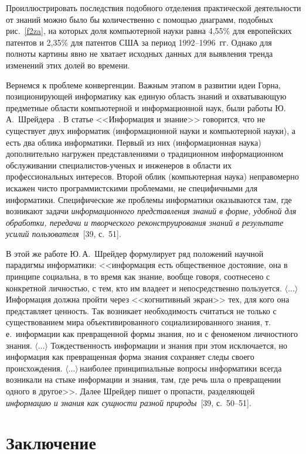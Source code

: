 \begin{multicols}{2}
      Проиллюстрировать последствия подобного от\-де\-ле\-ния практической деятельности от
знаний можно было бы количественно с помощью диаграмм, подобных рис.~\ref{f2za}, 
на которых доля ком\-пьютер\-ной науки равна 4,55\% для европейских патен\-тов и
2,35\% для патентов США за период 1992--1996~гг. Однако для полноты картины явно не
хватает исходных данных для выявления тренда изменений этих долей во времени.

      Вернемся к проблеме конвергенции. Важным этапом в развитии идеи Горна,
позиционирующей информатику как единую область знаний и охватывающую предметные
области компьютерной и информационной наук, были работы Ю.\,А.~Шрейдера~\cite{38za, 39za}. 
В статье <<Информация и знание>> говорится, что не существует двух
информатик (информационной науки и компьютерной науки), а есть два облика информатики.
Первый из них (информационная наука) дополнительно нагружен представлениями о
традиционном информационном обслуживании специалистов-ученых и инженеров в области
их профессиональных интересов. Второй облик (компьютерная наука) неправомерно искажен
чисто программистскими проблемами, не специфичными для информатики. Специфические же
проблемы информатики оказываются там, где возникают задачи \textit{информационного
представления знаний в форме, удобной для обработки, передачи и творческого
реконструирования знаний в результате усилий пользователя}~[39, с.~51].

      В этой же работе Ю.\,А.~Шрейдер формулирует ряд положений научной парадигмы
информатики: <<информация есть общественное достояние, она в принципе социальна, в то
время как знание, вообще говоря, соотнесено с конкретной личностью, с тем, кто им владеет и
непосредственно пользуется. $\langle\ldots\rangle$ Информация должна пройти через
<<когнитивный экран>> тех, для кого она пред\-став\-ля\-ет ценность. Так возникает необходимость
считаться не только с суще\-ст\-во\-ва\-ни\-ем мира объективированного социализированного знания,
т.\,е.\ информации как превращенной формы знания, но и с феноменом личностного знания.
$\langle\ldots\rangle$ Тож\-де\-ст\-вен\-ность информации и знания при этом исключается, но
информация как превращенная форма знания сохраняет следы своего происхождения.
$\langle\ldots\rangle$\,наиболее принципиальные вопросы информатики всегда возникали на
стыке информации и знания, там, где речь шла о превращении одного в другое>>. Далее
Шрейдер пишет о пропасти, разделяющей \textit{информацию и знания как сущности разной
природы}~[39, с.~50--51].

\section{Заключение} %


\end{multicols}
